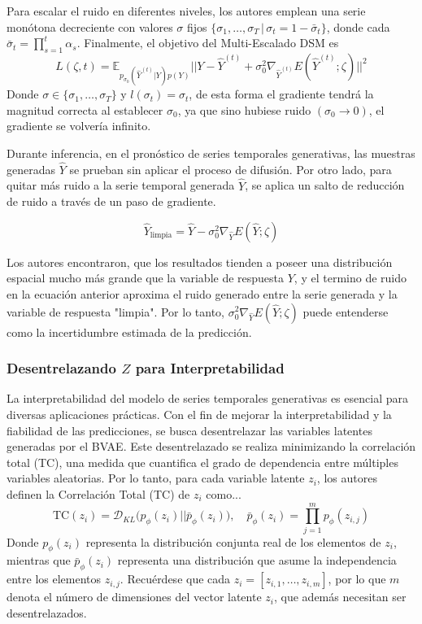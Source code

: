 \documentclass[12pt,letterpaper]{article}
\begin{document}
Para escalar el ruido en diferentes niveles, los autores \cite{li2022generative} emplean una serie monótona decreciente con valores $\sigma$ fijos $\{\sigma_1, \dots, \sigma_T \,| \, \sigma_t=1-\bar{\sigma}_t \}$, donde cada $\bar{\sigma}_t=\prod_{s=1}^{t}\alpha_s$. Finalmente, el objetivo del Multi-Escalado DSM es
\begin{equation}
    L(\zeta, t) = \mathbb{E}_{p_{\sigma_0}(\hat{Y}^{(t)}|Y) p(Y)} 
    || Y - \hat{Y}^{(t)}+ \sigma_0^2 \nabla_{\hat{Y}^{(t)}}E(\hat{Y}^{(t)};\zeta)||^{2}
\end{equation}
Donde $\sigma\in\{\sigma_1, \dots, \sigma_T \}$ y $l(\sigma_t)=\sigma_t$, de esta forma el gradiente tendrá la magnitud correcta al establecer $\sigma_0$, ya que sino hubiese ruido $(\sigma_0\to0)$, el gradiente se volvería infinito.

Durante inferencia, en el pronóstico de series temporales generativas, las muestras generadas $\hat{Y}$ se prueban sin aplicar el proceso de difusión. Por otro lado, para quitar más ruido a la serie temporal generada $\hat{Y}$, se aplica un salto de reducción de ruido a través de un paso de gradiente.

\begin{equation}
    \hat{Y}_{\text{limpia}}= \hat{Y}- \sigma_0^{2}\nabla_{\hat{Y}}E(\hat{Y};\zeta)
\end{equation}

Los autores encontraron, que los resultados tienden a poseer una distribución espacial mucho más grande que la variable de respuesta $Y$, y el termino de ruido en la ecuación anterior aproxima el ruido generado entre la serie generada y la variable de respuesta "limpia". Por lo tanto, $\sigma_0^2 \nabla_{\hat{Y}}E(\hat{Y};\zeta)$ puede entenderse como la incertidumbre estimada de la predicción. \cite{li2022generative}

\subsubsection{Desentrelazando $Z$ para Interpretabilidad }
La interpretabilidad del modelo de series temporales generativas es esencial para diversas aplicaciones prácticas. Con el fin de mejorar la interpretabilidad y la fiabilidad de las predicciones, se busca desentrelazar las variables latentes generadas por el BVAE. Este desentrelazado se realiza minimizando la correlación total (TC), una medida que cuantifica el grado de dependencia entre múltiples variables aleatorias. Por lo tanto, para cada variable latente $z_i$, los autores \cite{li2022generative} definen la Correlación Total (TC) de $z_i$ como...
\begin{equation}
    \text{TC}(z_i)=\mathcal{D}_{KL}\big( p_{\phi}(z_i) || \bar{p}_\phi(z_i)\big), \quad \bar{p}_\phi(z_i)=\prod_{j=1}^{m}p_{\phi}(z_{i,j})
\end{equation}
Donde $p_\phi(z_i)$ representa la distribución conjunta real de los elementos de $z_i$, mientras que $\bar{p}_\phi(z_i)$ representa una distribución que asume la independencia entre los elementos $z_{i,j}$. Recuérdese que cada $z_i=[z_{i,1}, \dots, z_{i,m}]$, por lo que $m$ denota el número de dimensiones del vector latente $z_i$, que además necesitan ser desentrelazados.
\end{document}
